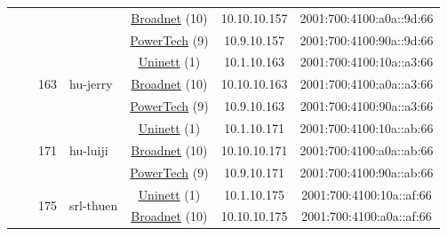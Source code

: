 \begin{small}
\begin{center}
\begin{longtable}{|c|c|c|c|c|c|c|c|}
  &  &  &  & \multicolumn{2}{|c|}{\tiny{\href{https://www.broadnet.no}{Broadnet} (10)}} & \tiny{10.10.10.157} & \tiny{2001:700:4100:a0a::9d:66} \\* \cline{5-5}\cline{6-6}\cline{7-7}\cline{8-8}
  &  &  &  & \multicolumn{2}{|c|}{\tiny{\href{http://www.powertech.no}{PowerTech} (9)}} & \tiny{10.9.10.157} & \tiny{2001:700:4100:90a::9d:66} \\* \cline{3-3}\cline{4-4}\cline{5-5}\cline{6-6}\cline{7-7}\cline{8-8}
  &  & \multirow{3}{*}{\tiny{163}} & \multicolumn{1}{|l|}{\multirow{3}{*}{\tiny{hu-jerry}}} & \multicolumn{2}{|c|}{\tiny{\href{https://www.uninett.no}{Uninett} (1)}} & \tiny{10.1.10.163} & \tiny{2001:700:4100:10a::a3:66} \\* \cline{5-5}\cline{6-6}\cline{7-7}\cline{8-8}
  &  &  &  & \multicolumn{2}{|c|}{\tiny{\href{https://www.broadnet.no}{Broadnet} (10)}} & \tiny{10.10.10.163} & \tiny{2001:700:4100:a0a::a3:66} \\* \cline{5-5}\cline{6-6}\cline{7-7}\cline{8-8}
  &  &  &  & \multicolumn{2}{|c|}{\tiny{\href{http://www.powertech.no}{PowerTech} (9)}} & \tiny{10.9.10.163} & \tiny{2001:700:4100:90a::a3:66} \\* \cline{3-3}\cline{4-4}\cline{5-5}\cline{6-6}\cline{7-7}\cline{8-8}
  &  & \multirow{3}{*}{\tiny{171}} & \multicolumn{1}{|l|}{\multirow{3}{*}{\tiny{hu-luiji}}} & \multicolumn{2}{|c|}{\tiny{\href{https://www.uninett.no}{Uninett} (1)}} & \tiny{10.1.10.171} & \tiny{2001:700:4100:10a::ab:66} \\* \cline{5-5}\cline{6-6}\cline{7-7}\cline{8-8}
  &  &  &  & \multicolumn{2}{|c|}{\tiny{\href{https://www.broadnet.no}{Broadnet} (10)}} & \tiny{10.10.10.171} & \tiny{2001:700:4100:a0a::ab:66} \\* \cline{5-5}\cline{6-6}\cline{7-7}\cline{8-8}
  &  &  &  & \multicolumn{2}{|c|}{\tiny{\href{http://www.powertech.no}{PowerTech} (9)}} & \tiny{10.9.10.171} & \tiny{2001:700:4100:90a::ab:66} \\* \cline{3-3}\cline{4-4}\cline{5-5}\cline{6-6}\cline{7-7}\cline{8-8}
  &  & \multirow{3}{*}{\tiny{175}} & \multicolumn{1}{|l|}{\multirow{3}{*}{\tiny{srl-thuen}}} & \multicolumn{2}{|c|}{\tiny{\href{https://www.uninett.no}{Uninett} (1)}} & \tiny{10.1.10.175} & \tiny{2001:700:4100:10a::af:66} \\* \cline{5-5}\cline{6-6}\cline{7-7}\cline{8-8}
  &  &  &  & \multicolumn{2}{|c|}{\tiny{\href{https://www.broadnet.no}{Broadnet} (10)}} & \tiny{10.10.10.175} & \tiny{2001:700:4100:a0a::af:66} \\* \cline{5-5}\cline{6-6}\cline{7-7}\cline{8-8}

\end{longtable}
\end{center}
\end{small}
